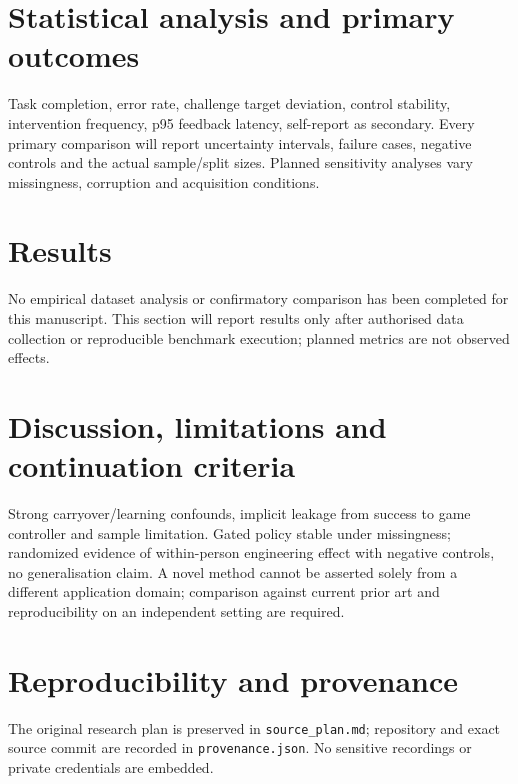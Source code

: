 \documentclass[11pt,a4paper]{article}
\begin{document}
\section{Statistical analysis and primary outcomes}
Task completion, error rate, challenge target deviation, control stability, intervention frequency, p95 feedback latency, self-report as secondary. Every primary comparison will report uncertainty intervals, failure cases, negative controls and the actual sample/split sizes. Planned sensitivity analyses vary missingness, corruption and acquisition conditions.
\section{Results}
No empirical dataset analysis or confirmatory comparison has been completed for this manuscript. This section will report results only after authorised data collection or reproducible benchmark execution; planned metrics are not observed effects.
\section{Discussion, limitations and continuation criteria}
Strong carryover/learning confounds, implicit leakage from success to game controller and sample limitation. Gated policy stable under missingness; randomized evidence of within-person engineering effect with negative controls, no generalisation claim. A novel method cannot be asserted solely from a different application domain; comparison against current prior art and reproducibility on an independent setting are required.
\section{Reproducibility and provenance}
The original research plan is preserved in \texttt{source\_plan.md}; repository and exact source commit are recorded in \texttt{provenance.json}. No sensitive recordings or private credentials are embedded.
\end{document}
